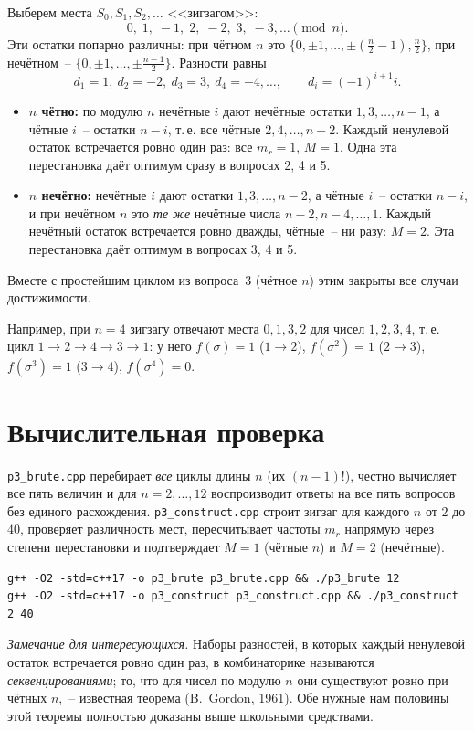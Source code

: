 \documentclass[12pt,a4paper]{article}
\begin{document}
Выберем места $S_0,S_1,S_2,\dots$ <<зигзагом>>:
\[
  0,\;1,\;-1,\;2,\;-2,\;3,\;-3,\dots\pmod n .
\]
Эти остатки попарно различны: при чётном $n$ это
$\{0,\pm1,\dots,\pm(\tfrac n2-1),\tfrac n2\}$, при нечётном~--
$\{0,\pm1,\dots,\pm\tfrac{n-1}2\}$. Разности равны
\[
  d_1=1,\ d_2=-2,\ d_3=3,\ d_4=-4,\dots,\qquad d_i=(-1)^{i+1}i .
\]
\begin{itemize}
  \item \textbf{$n$ чётно:} по модулю $n$ нечётные $i$ дают нечётные
        остатки $1,3,\dots,n-1$, а чётные $i$~-- остатки $n-i$, т.\,е.
        все чётные $2,4,\dots,n-2$. Каждый ненулевой остаток встречается
        ровно один раз: все $m_r=1$, $M=1$. Одна эта перестановка даёт
        оптимум сразу в вопросах 2, 4 и 5.
  \item \textbf{$n$ нечётно:} нечётные $i$ дают остатки $1,3,\dots,n-2$,
        а чётные $i$~-- остатки $n-i$, и при нечётном $n$ это \emph{те
        же} нечётные числа $n-2,n-4,\dots,1$. Каждый нечётный остаток
        встречается ровно дважды, чётные~-- ни разу: $M=2$. Эта
        перестановка даёт оптимум в вопросах 3, 4 и 5.
\end{itemize}
Вместе с простейшим циклом из вопроса~3 (чётное $n$) этим закрыты все
случаи достижимости.

Например, при $n=4$ зигзагу отвечают места $0,1,3,2$ для чисел $1,2,3,4$,
т.\,е. цикл $1\to2\to4\to3\to1$: у него $f(\sigma)=1$ ($1\to2$),
$f(\sigma^{2})=1$ ($2\to3$), $f(\sigma^{3})=1$ ($3\to4$),
$f(\sigma^{4})=0$.

\section{Вычислительная проверка}

\texttt{p3\_brute.cpp} перебирает \emph{все} циклы длины $n$ (их
$(n-1)!$), честно вычисляет все пять величин и для $n=2,\dots,12$
воспроизводит ответы на все пять вопросов без единого расхождения.
\texttt{p3\_construct.cpp} строит зигзаг для каждого $n$ от $2$ до $40$,
проверяет различность мест, пересчитывает частоты $m_r$ напрямую через
степени перестановки и подтверждает $M=1$ (чётные $n$) и $M=2$ (нечётные).

\begin{verbatim}
g++ -O2 -std=c++17 -o p3_brute p3_brute.cpp && ./p3_brute 12
g++ -O2 -std=c++17 -o p3_construct p3_construct.cpp && ./p3_construct 2 40
\end{verbatim}

\emph{Замечание для интересующихся.} Наборы разностей, в которых каждый
ненулевой остаток встречается ровно один раз, в комбинаторике называются
\emph{секвенцированиями}; то, что для чисел по модулю $n$ они существуют
ровно при чётных $n$,~-- известная теорема (B.~Gordon, 1961). Обе нужные
нам половины этой теоремы полностью доказаны выше школьными средствами.
\end{document}
